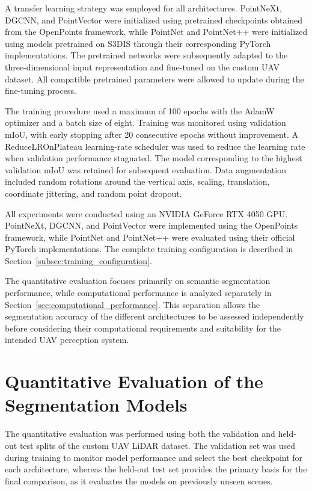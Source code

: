 A transfer learning strategy was employed for all architectures. PointNeXt, DGCNN, and PointVector were initialized using pretrained checkpoints obtained from the OpenPoints framework, while PointNet and PointNet++ were initialized using models pretrained on S3DIS through their corresponding PyTorch implementations. The pretrained networks were subsequently adapted to the three-dimensional input representation and fine-tuned on the custom UAV dataset. All compatible pretrained parameters were allowed to update during the fine-tuning process.

The training procedure used a maximum of 100 epochs with the AdamW optimizer and a batch size of eight. Training was monitored using validation mIoU, with early stopping after 20 consecutive epochs without improvement. A ReduceLROnPlateau learning-rate scheduler was used to reduce the learning rate when validation performance stagnated. The model corresponding to the highest validation mIoU was retained for subsequent evaluation. Data augmentation included random rotations around the vertical axis, scaling, translation, coordinate jittering, and random point dropout.

All experiments were conducted using an NVIDIA GeForce RTX 4050 GPU. PointNeXt, DGCNN, and PointVector were implemented using the OpenPoints framework, while PointNet and PointNet++ were evaluated using their official PyTorch implementations. The complete training configuration is described in Section~\ref{subsec:training_configuration}.

The quantitative evaluation focuses primarily on semantic segmentation performance, while computational performance is analyzed separately in Section~\ref{sec:computational_performance}. This separation allows the segmentation accuracy of the different architectures to be assessed independently before considering their computational requirements and suitability for the intended UAV perception system.

\section{Quantitative Evaluation of the Segmentation Models}
\label{subsec:quantitative_results}
The quantitative evaluation was performed using both the validation and held-out test splits of the custom UAV LiDAR dataset. The validation set was used during training to monitor model performance and select the best checkpoint for each architecture, whereas the held-out test set provides the primary basis for the final comparison, as it evaluates the models on previously unseen scenes.

